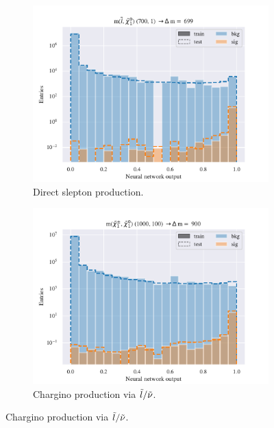 \begin{figure}[H]
    \centering
    \begin{subfigure}[t!]{0.49\textwidth}
        \includegraphics[width = \textwidth]{Figures/SlepSlep/ML/NN/All_level/High/scaled_train_test_396033.pdf}
        \caption{Direct slepton production.}
        \label{fig:SlepslepNNHigh}
    \end{subfigure}
    \begin{subfigure}[t!]{0.49\textwidth}
        \includegraphics[width = \textwidth]{Figures/SlepSnu/NN/All_level/High/scaled_train_test_397169.pdf}
        \caption{Chargino production via $\Tilde{l}/\Tilde{\nu}$.}
        \label{fig:SlepsnuNNHigh}
    \end{subfigure}      

\end{figure}
